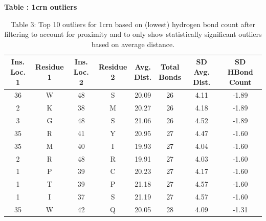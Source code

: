 \documentclass[sigconf, screen, authorversion, authoraddress=false, oneside]{acmart}
\begin{document}
\begin{table}[!ht] %
    \centering
    \textbf{\large Table \thetable: 1crn outliers} \\[1ex]
    {\small
    \setlength{\tabcolsep}{2pt} %
    \begin{tabular}{cccccccc}
    \toprule
    \makecell{Ins.\\Loc. 1} & 
    \makecell{Residue\\1} & 
    \makecell{Ins.\\Loc. 2} & 
    \makecell{Residue\\2} & 
    \makecell{Avg.\\Dist.} & 
    \makecell{Total\\Bonds} & 
    \makecell{SD Avg.\\Dist.} & 
    \makecell{SD HBond\\Count} \\
    \midrule
    36 & W & 48 & S & 20.09 & 26 & 4.11 & -1.89 \\
    2 & K & 38 & M & 20.27 & 26 & 4.18 & -1.89 \\
    3 & G & 48 & S & 21.06 & 26 & 4.52 & -1.89 \\
    35 & R & 41 & Y & 20.95 & 27 & 4.47 & -1.60 \\
    35 & M & 40 & I & 19.93 & 27 & 4.04 & -1.60 \\
    2 & R & 48 & R & 19.91 & 27 & 4.03 & -1.60 \\
    1 & P & 39 & C & 20.23 & 27 & 4.17 & -1.60 \\
    1 & T & 39 & P & 21.18 & 27 & 4.57 & -1.60 \\
    1 & I & 37 & S & 21.19 & 27 & 4.57 & -1.60 \\
    35 & W & 42 & Q & 20.05 & 28 & 4.09 & -1.31 \\
    \bottomrule
    \end{tabular}
    }
    \caption*{Table 3: Top 10 outliers for 1crn based on (lowest) hydrogen bond count after filtering to account for proximity and to only show statistically significant outliers based on average distance.}
    \label{table:3}
\end{table}
\end{document}
